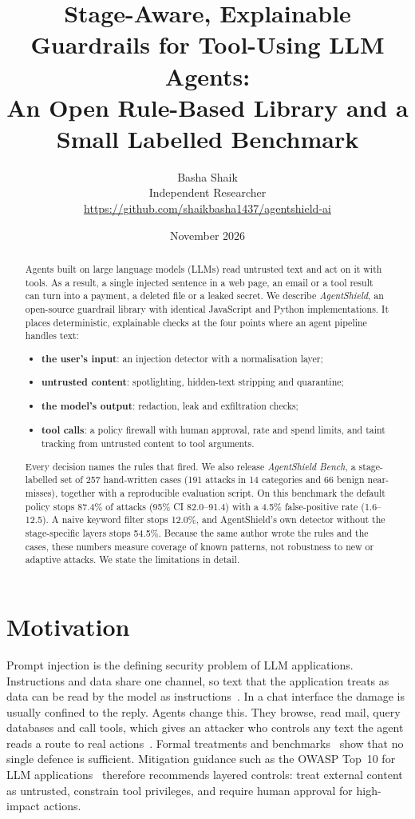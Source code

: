 \documentclass[10pt]{article}
\title{Stage-Aware, Explainable Guardrails for Tool-Using LLM Agents:\\An Open Rule-Based Library and a Small Labelled Benchmark}
\author{Basha Shaik\\Independent Researcher\\\small\url{https://github.com/shaikbasha1437/agentshield-ai}}
\date{November 2026}
\begin{document}
\maketitle

\begin{abstract}
Agents built on large language models (LLMs) read untrusted text and act on it with tools. As a result, a single injected sentence in a web page, an email or a tool result can turn into a payment, a deleted file or a leaked secret. We describe \emph{AgentShield}, an open-source guardrail library with identical JavaScript and Python implementations. It places deterministic, explainable checks at the four points where an agent pipeline handles text:
\begin{itemize}
\item \textbf{the user's input}: an injection detector with a normalisation layer;
\item \textbf{untrusted content}: spotlighting, hidden-text stripping and quarantine;
\item \textbf{the model's output}: redaction, leak and exfiltration checks;
\item \textbf{tool calls}: a policy firewall with human approval, rate and spend limits, and taint tracking from untrusted content to tool arguments.
\end{itemize}
Every decision names the rules that fired. We also release \emph{AgentShield Bench}, a stage-labelled set of 257 hand-written cases (191 attacks in 14 categories and 66 benign near-misses), together with a reproducible evaluation script. On this benchmark the default policy stops 87.4\% of attacks (95\% CI 82.0--91.4) with a 4.5\% false-positive rate (1.6--12.5). A naive keyword filter stops 12.0\%, and AgentShield's own detector without the stage-specific layers stops 54.5\%. Because the same author wrote the rules and the cases, these numbers measure coverage of known patterns, not robustness to new or adaptive attacks. We state the limitations in detail.
\end{abstract}

\section{Motivation}
Prompt injection is the defining security problem of LLM applications. Instructions and data share one channel, so text that the application treats as data can be read by the model as instructions~\citep{perez2022ignore,greshake2023indirect}. In a chat interface the damage is usually confined to the reply. Agents change this. They browse, read mail, query databases and call tools, which gives an attacker who controls any text the agent reads a route to real actions~\citep{greshake2023indirect,zhan2024injecagent,debenedetti2024agentdojo}. Formal treatments and benchmarks~\citep{liu2024formalizing,yi2025bipia} show that no single defence is sufficient. Mitigation guidance such as the OWASP Top~10 for LLM applications~\citep{owasp2025llm} therefore recommends layered controls: treat external content as untrusted, constrain tool privileges, and require human approval for high-impact actions.
\end{document}
